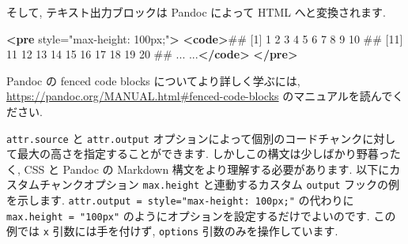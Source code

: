 \documentclass[
  11pt,
  lualatex,ja=standard,jafont=noto]{bxjsreport}
\newenvironment{Shaded}{\begin{snugshade}}{\end{snugshade}}
\newcommand{\KeywordTok}[1]{\textcolor[rgb]{0.13,0.29,0.53}{\textbf{#1}}}
\newcommand{\NormalTok}[1]{#1}
\newcommand{\OtherTok}[1]{\textcolor[rgb]{0.56,0.35,0.01}{#1}}
\newcommand{\StringTok}[1]{\textcolor[rgb]{0.31,0.60,0.02}{#1}}
\begin{document}
そして, テキスト出力ブロックは Pandoc によって HTML へと変換されます.

\begin{Shaded}
\begin{Highlighting}[]
\KeywordTok{\textless{}pre}\OtherTok{ style=}\StringTok{"max{-}height: 100px;"}\KeywordTok{\textgreater{}}
\KeywordTok{\textless{}code\textgreater{}}\NormalTok{\#\#   [1]   1   2   3   4   5   6   7   8   9  10}
\NormalTok{\#\#  [11]  11  12  13  14  15  16  17  18  19  20}
\NormalTok{\#\#  ... ...}\KeywordTok{\textless{}/code\textgreater{}}
\KeywordTok{\textless{}/pre\textgreater{}}
\end{Highlighting}
\end{Shaded}

Pandoc の fenced code blocks についてより詳しく学ぶには, \url{https://pandoc.org/MANUAL.html\#fenced-code-blocks} のマニュアルを読んでください.

\texttt{attr.source} と \texttt{attr.output} オプションによって個別のコードチャンクに対して最大の高さを指定することができます. しかしこの構文は少しばかり野暮ったく, CSS と Pandoc の Markdown 構文をより理解する必要があります. 以下にカスタムチャンクオプション \texttt{max.height} と連動するカスタム \texttt{output} フックの例を示します. \texttt{attr.output = \textquotesingle{}style="max-height:\ 100px;"\textquotesingle{}} の代わりに \texttt{max.height = "100px"} のようにオプションを設定するだけでよいのです. この例では \texttt{x} 引数には手を付けず, \texttt{options} 引数のみを操作しています.
\end{document}
